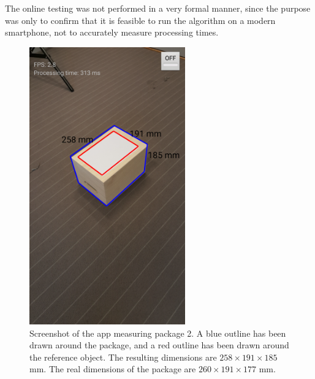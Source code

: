 The online testing was not performed in a very formal manner, since the purpose was only to confirm that it is feasible to run the algorithm on a modern smartphone, not to accurately measure processing times.

\begin{figure}%
\begin{center}
\includegraphics[width=0.6\textwidth]{figures/screenshot.png}
\end{center}
\caption{Screenshot of the app measuring package 2. A blue outline has been drawn around the package, and a red outline has been drawn around the reference object. The resulting dimensions are $258 \times 191 \times 185$ mm. The real dimensions of the package are $260 \times 191 \times 177$ mm.}
\label{fig:screenshot}
\end{figure}
